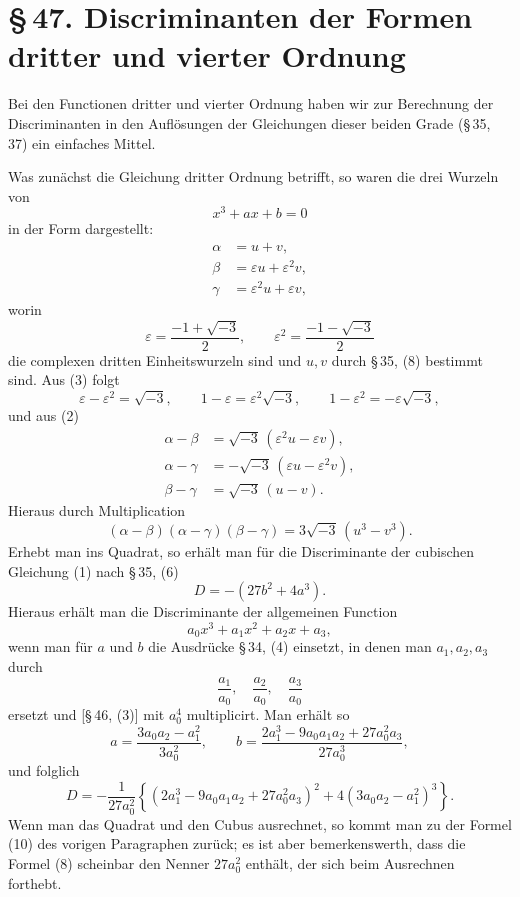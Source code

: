 \documentclass[11pt]{article}
\providecommand{\sect}[2]{\section*{\S\,#1. #2}}
\begin{document}
\sect{47}{Discriminanten der Formen dritter und vierter Ordnung}

Bei den Functionen dritter und vierter Ordnung haben wir zur Berechnung der Discriminanten in den Auflösungen der Gleichungen dieser beiden Grade (\S\,35, 37) ein einfaches Mittel.

Was zunächst die Gleichung dritter Ordnung betrifft, so waren die drei Wurzeln von
\begin{equation}
x^3+ax+b=0
\tag{1}
\end{equation}
in der Form dargestellt:
\begin{equation}
\begin{aligned}
\alpha&=u+v,\\
\beta&=\varepsilon u+\varepsilon^2v,\\
\gamma&=\varepsilon^2u+\varepsilon v,
\end{aligned}
\tag{2}
\end{equation}
worin
\begin{equation}
 \varepsilon=\frac{-1+\sqrt{-3}}{2},\qquad
 \varepsilon^2=\frac{-1-\sqrt{-3}}{2}
\tag{3}
\end{equation}
die complexen dritten Einheitswurzeln sind und $u,v$ durch \S\,35, (8) bestimmt sind. Aus (3) folgt
\begin{equation}
 \varepsilon-\varepsilon^2=\sqrt{-3},\qquad
 1-\varepsilon=\varepsilon^2\sqrt{-3},\qquad
 1-\varepsilon^2=-\varepsilon\sqrt{-3},
\tag{4}
\end{equation}
und aus (2)
\[
\begin{aligned}
\alpha-\beta&=\sqrt{-3}\, (\varepsilon^2u-\varepsilon v),\\
\alpha-\gamma&=-\sqrt{-3}\,(\varepsilon u-\varepsilon^2v),\\
\beta-\gamma&=\sqrt{-3}\,(u-v).
\end{aligned}
\]
Hieraus durch Multiplication
\begin{equation}
(\alpha-\beta)(\alpha-\gamma)(\beta-\gamma)=3\sqrt{-3}\,(u^3-v^3).
\tag{5}
\end{equation}
Erhebt man ins Quadrat, so erhält man für die Discriminante der cubischen Gleichung (1) nach \S\,35, (6)
\begin{equation}
D=-(27b^2+4a^3).
\tag{6}
\end{equation}
Hieraus erhält man die Discriminante der allgemeinen Function
\begin{equation}
a_0x^3+a_1x^2+a_2x+a_3,
\tag{7}
\end{equation}
wenn man für $a$ und $b$ die Ausdrücke \S\,34, (4) einsetzt, in denen man $a_1,a_2,a_3$ durch
\[
\frac{a_1}{a_0},\quad \frac{a_2}{a_0},\quad \frac{a_3}{a_0}
\]
ersetzt und [\S\,46, (3)] mit $a_0^4$ multiplicirt. Man erhält so
\[
 a=\frac{3a_0a_2-a_1^2}{3a_0^2},
 \qquad
 b=\frac{2a_1^3-9a_0a_1a_2+27a_0^2a_3}{27a_0^3},
\]
und folglich
\begin{equation}
D=-\frac{1}{27a_0^2}\left\{(2a_1^3-9a_0a_1a_2+27a_0^2a_3)^2
       +4(3a_0a_2-a_1^2)^3\right\}.
\tag{8}
\end{equation}
Wenn man das Quadrat und den Cubus ausrechnet, so kommt man zu der Formel (10) des vorigen Paragraphen zurück; es ist aber bemerkenswerth, dass die Formel (8) scheinbar den Nenner $27a_0^2$ enthält, der sich beim Ausrechnen forthebt.
\end{document}
